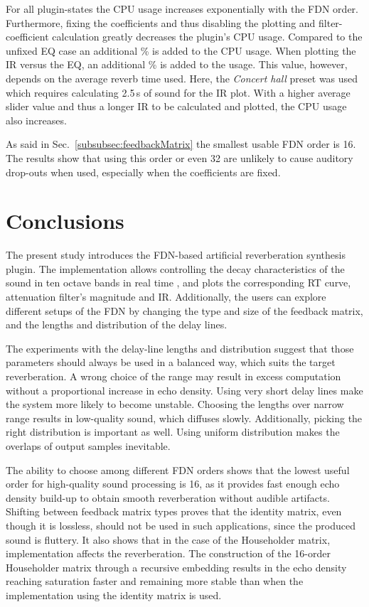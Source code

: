 \documentclass[twoside,a4paper]{article}
\begin{document}
\noindent For all plugin-states the CPU usage increases exponentially with the FDN order. Furthermore, fixing the coefficients and thus disabling the plotting and filter-coefficient calculation greatly decreases the plugin's CPU usage. Compared to the unfixed EQ case an additional \% is added to the CPU usage. When plotting the IR versus the EQ, an additional \% is added to the usage. This value, however, depends on the average reverb time used. Here, the \textit{Concert hall} preset was used which requires calculating 2.5\,s of sound for the IR plot. With a higher average slider value and thus a longer IR to be calculated and plotted, the CPU usage also increases.

As said in Sec.~\ref{subsubsec:feedbackMatrix} the smallest usable FDN order is 16. The results show that using this order or even 32 are unlikely to cause auditory drop-outs when used, especially when the coefficients are fixed.

\section{Conclusions}\label{sec:conclusion}

The present study introduces the FDN-based artificial reverberation synthesis plugin. The implementation allows controlling the decay characteristics of the sound in ten octave bands in real time%
, and plots the corresponding RT curve, attenuation filter's magnitude and IR. %
Additionally, the users can explore different setups of the FDN by changing the type and size of the feedback matrix, and the lengths and distribution of the delay lines. 

The experiments with the delay-line lengths and distribution suggest that those parameters should always be used in a balanced way, which suits the target reverberation. A wrong choice of the range may result in excess computation without a proportional increase in echo density. Using very short delay lines make the system more likely to become unstable. Choosing the lengths over narrow range results in low-quality sound, which diffuses slowly. Additionally, picking the right distribution is important as well. Using uniform distribution makes the overlaps of output samples inevitable. 

The ability to choose among different FDN orders shows that the lowest useful order for high-quality sound processing is 16, as it provides fast enough echo density build-up to obtain smooth reverberation without audible artifacts. Shifting between feedback matrix types proves that the identity matrix, even though it is lossless, should not be used in such applications, since the produced sound is fluttery. It also shows that in the case of the Householder matrix, implementation affects the reverberation. The construction of the 16-order Householder matrix through a recursive embedding results in the echo density reaching saturation faster and remaining more stable than when the implementation using the identity matrix is used.
\end{document}
